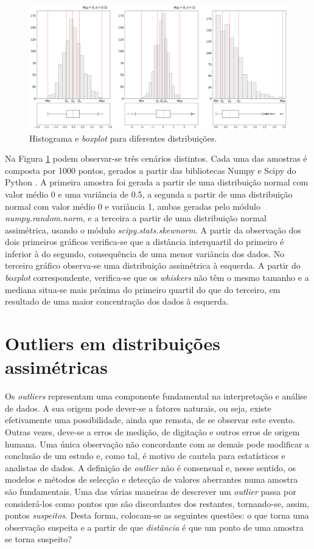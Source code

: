 \begin{figure}[H]
	\centering
	\includegraphics[width=\textwidth]{imagens/stats/hist2.png}
	\caption{Histograma e \textit{boxplot} para diferentes distribuições.}
	\label{fig:histos}
\end{figure}

Na Figura \ref{fig:histos} podem observar-se três cenários distintos. Cada uma das amostras é composta por 1000 pontos, gerados a partir das bibliotecas Numpy e Scipy do Python \cite{python}. A primeira amostra foi gerada a partir de uma distribuição normal com valor médio 0 e uma variância de 0.5, a segunda a partir de uma distribuição normal com valor médio 0 e variância 1, ambas geradas pelo módulo \textit{numpy.random.norm}, e a terceira a partir de uma distribuição normal assimétrica, usando o módulo \textit{scipy.stats.skewnorm}. A partir da observação dos dois primeiros gráficos verifica-se que a distância interquartil do primeiro é inferior à do segundo, consequência de uma menor variância dos dados. No terceiro gráfico observa-se uma distribuição assimétrica à esquerda. A partir do \textit{boxplot} correspondente, verifica-se que os \textit{whiskers} não têm o mesmo tamanho e a mediana situa-se mais próxima do primeiro quartil do que do terceiro, em resultado de uma maior concentração dos dados à esquerda. 


\section{Outliers em distribuições assimétricas}

Os \textit{outliers} representam uma componente fundamental na interpretação e análise de dados. A sua origem pode dever-se a fatores naturais, ou seja, existe efetivamente uma possibilidade, ainda que remota, de se observar este evento. Outras vezes, deve-se a erros de medição, de digitação e outros erros de origem humana. Uma única observação não concordante com as demais pode modificar a conclusão de um estudo e, como tal, é motivo de cautela para estatísticos e analistas de dados. A definição de \textit{outlier} não é consensual e, nesse sentido, os modelos e métodos de selecção e detecção de valores aberrantes numa amostra são fundamentais. Uma das várias maneiras de descrever um \textit{outlier} passa por considerá-los como pontos que são discordantes dos restantes, tornando-se, assim, pontos \textit{suspeitos}\cite{spe}. Desta forma, colocam-se as seguintes questões: o que torna uma observação suspeita e a partir de que \textit{distância} é que um ponto de uma amostra se torna suspeito? 


